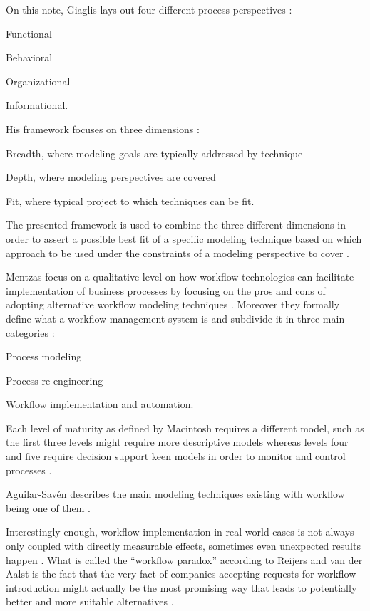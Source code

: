 \documentclass{seal_thesis}
\begin{document}
On this note, Giaglis lays out four different process perspectives \cite{Giaglis2001}:
\begin{enumerate*}
	\item Functional
	\item Behavioral
	\item Organizational
	\item Informational.
\end{enumerate*}

His framework focuses on three dimensions \cite{Giaglis2001}:
\begin{enumerate*}
	\item Breadth, where modeling goals are typically addressed by technique
	\item Depth, where modeling perspectives are covered
	\item Fit, where typical project to which techniques can be fit.
\end{enumerate*}

The presented framework is used to combine the three different dimensions in order to assert a possible best fit of a specific modeling technique based on which approach to be used under the constraints of a modeling perspective to cover \cite{Giaglis2001}.

Mentzas \etal focus on a qualitative level on how workflow technologies can facilitate implementation of business processes by focusing on the pros and cons of adopting alternative workflow modeling techniques \cite{Mentzas2001}. Moreover they formally define what a workflow management system is and subdivide it in three main categories \cite{Mentzas2001}:
\begin{enumerate*}
	\item Process modeling
	\item Process re-engineering
	\item Workflow implementation and automation.
\end{enumerate*}

Each level of maturity as defined by Macintosh requires a different model, such as the first three levels might require more descriptive models whereas levels four and five require decision support keen models in order to monitor and control processes \cite{Mentzas2001}.

Aguilar-Sav\'{e}n describes the main modeling techniques existing with workflow being one of them \cite{Aguilar-Saven2004}.

Interestingly enough, workflow implementation in real world cases is not always only coupled with directly measurable effects, sometimes even unexpected results happen \cite{Reijers2005}. What is called the ``workflow paradox'' according to Reijers and van der Aalst is the fact that the very fact of companies accepting requests for workflow introduction might actually be the most promising way that leads to potentially better and more suitable alternatives \cite{Reijers2005}.
\end{document}
